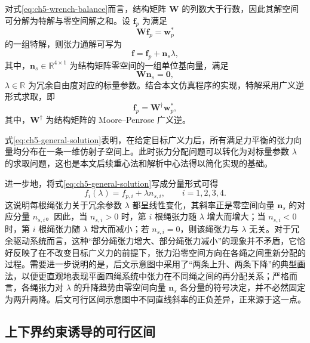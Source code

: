 对式\eqref{eq:ch5-wrench-balance}而言，结构矩阵 $\bm W$ 的列数大于行数，因此其解空间可分解为特解与零空间解之和。设 $\bm f_p$ 为满足
\begin{equation}
  \bm W\bm f_p=\bm w_p^\ast \label{eq:ch5-fp}
\end{equation}
的一组特解，则张力通解可写为
\begin{equation}
  \bm f=\bm f_p+\bm n_s\lambda, \label{eq:ch5-general-solution}
\end{equation}
其中，$\bm n_s\in\mathbb R^{4\times 1}$ 为结构矩阵零空间的一组单位基向量，满足
\begin{equation}
  \bm W\bm n_s=\bm 0, \label{eq:ch5-nullspace}
\end{equation}
$\lambda\in\mathbb R$ 为冗余自由度对应的标量参数。结合本文仿真程序的实现，特解采用广义逆形式求取，即
\begin{equation}
  \bm f_p=\bm W^\dagger \bm w_p^\ast, \label{eq:ch5-fp-pinv}
\end{equation}
其中，$\bm W^\dagger$ 为结构矩阵的 Moore--Penrose 广义逆。

式\eqref{eq:ch5-general-solution}表明，在给定目标广义力后，所有满足力平衡的张力向量均分布在一条一维仿射子空间上。此时张力分配问题可以转化为对标量参数 $\lambda$ 的求取问题，这也是本文后续重心法和解析中心法得以简化实现的基础。

进一步地，将式\eqref{eq:ch5-general-solution}写成分量形式可得
\begin{equation}
  f_i(\lambda)=f_{p,i}+\lambda n_{s,i},\qquad i=1,2,3,4. \label{eq:ch5-fi-lambda}
\end{equation}
这说明每根绳张力关于冗余参数 $\lambda$ 都呈线性变化，其斜率正是零空间向量 $\bm n_s$ 的对应分量 $n_{s,i}$。因此，当 $n_{s,i}>0$ 时，第 $i$ 根绳张力随 $\lambda$ 增大而增大；当 $n_{s,i}<0$ 时，第 $i$ 根绳张力随 $\lambda$ 增大而减小；若 $n_{s,i}=0$，则该绳张力与 $\lambda$ 无关。对于冗余驱动系统而言，这种“部分绳张力增大、部分绳张力减小”的现象并不矛盾，它恰好反映了在不改变目标广义力的前提下，张力沿零空间方向在各绳之间重新分配的过程。需要进一步说明的是，后文示意图中采用了“两条上升、两条下降”的典型画法，以便更直观地表现平面四绳系统中张力在不同绳之间的再分配关系；严格而言，各绳张力对 $\lambda$ 的升降趋势由零空间向量 $\bm n_s$ 各分量的符号决定，并不必然固定为两升两降。后文可行区间示意图中不同直线斜率的正负差异，正来源于这一点。

\subsection{上下界约束诱导的可行区间}

